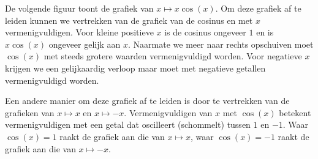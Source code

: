 \documentclass{ximera}
\begin{document}
\begin{center}
\end{center}

De volgende figuur toont de grafiek van $x\mapsto x \cos(x)$. Om deze grafiek
af te leiden kunnen we vertrekken van de grafiek van de cosinus en met
$x$ vermenigvuldigen. Voor kleine positieve $x$ is de cosinus ongeveer
$1$ en is $x\cos(x)$ ongeveer gelijk aan $x$. Naarmate we
meer naar rechts opschuiven moet $\cos(x)$ met steeds grotere waarden
vermenigvuldigd worden. Voor negatieve $x$ krijgen we een gelijkaardig
verloop maar moet met negatieve getallen vermenigvuldigd worden.

Een andere manier om deze grafiek af te leiden is door te vertrekken
van de grafieken van $x\mapsto x$ en $x\mapsto -x$. Vermenigvuldigen
van $x$ met $\cos(x)$ betekent vermenigvuldigen met een getal dat
oscilleert (schommelt) tussen $1$ en $-1$. Waar $\cos(x)=1$ raakt de
grafiek aan die van $x\mapsto x$, waar $\cos(x)=-1$ raakt de grafiek
aan die van $x\mapsto -x$.

\begin{center}
\end{center}
\end{document}
